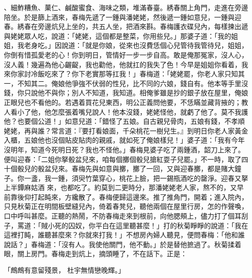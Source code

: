 \begin{showcontents}{}
、細鮓糟魚、菓仁、鹹酸蜜食、海味之類，堆滿春臺。綉春關上角門，走進在旁邊陪坐。於是篩上酒來，春梅先遞了一鍾與潘姥姥，然後遞一鍾如意兒，一鍾與迎春。綉春在旁邊炕兒上坐的，共五人坐，把酒來斟。春梅護衣碟兒內，每樣揀出遞與姥姥眾人吃，說道：「姥姥，這個都是整菜，你用些兒。」那婆子道：「我的姐姐，我老身吃。」因說道：「就是你娘，從來也沒費恁個心兒管待我管待兒，姐姐，你倒有惜孤愛老的心！你到明日，管情好一步一步自高。敢是俺那冤家，沒人心，沒人義！幾遍為他心齷齪，我也勸他，他就扛的我失了色！今早是姐姐你看着，我來你家討冷飯吃來了？你下老實那等扛我！」春梅道：「姥姥罷，你老人家只知其一，不知其二。俺娘他爭強不伏弱的性兒，比不同的六娘，錢自有。他本等手里沒錢，你只說他不與你；別人不知道，我知道。相俺爹雖是抄的銀子放在屋里，俺娘正眼兒也不看他的。若遇着買花兒東西，明公正義問他要，不恁瞞並藏背掖的；教人看小了他，他怎麼張着嘴兒說人！他本沒錢，姥姥怪他，就虧了他了。莫不我護他？也要個公道！」如意兒道：「錯怪了五娘。自古親兒骨肉，五娘有錢，不孝順姥姥，再與誰？常言道：『要打看娘面，千朵桃花一樹兒生。』到明日你老人家黃金入櫃，五娘他也沒個貼皮貼肉的親戚，就如死了俺娘樣兒！」婆子道：「我有今年沒明年，知道今死明日死？我也不怪他。」春梅見婆子吃了兩鍾酒，韶刀上來了。便叫迎春：「二姐你拏骰盆兒來，咱每個擲個骰兒搶紅耍子兒罷。」不一時，取了四十個骰兒的骰盆兒來。春梅先與如意與擲，擲了一回，又與迎春擲，都是賭大鐘子。你一盞，我一鍾，須臾竹葉穿心，桃花上臉，把一錫瓶酒吃的罄淨。迎春又拏上半鐔麻姑酒 來，也都吃了。約莫到二更時分，那潘姥姥老人家，熬不的，又早前靠後仰打起盹來，方纔散了。春梅便歸這邊來。推了推角門，開着；進入院內，只見秋菊正在明間板壁縫兒內，倚着春凳兒，聽他兩個在屋里行房，怎的作聲喚，口中呼叫甚麼。正聽的熱鬧，不防春梅走來到根前，向他腮頰上，儘力打了個耳刮子，罵道：「賊小死的囚奴，你平白在這里聽甚麼！」打的秋菊睜睜的說道：「我在這裡打盹，誰聽甚麼來？你就來打我！」不想房內婦人聽見，便問春梅：「他和誰說話？」春梅道：「沒有人。我使他關門，他不動。」於是替他摭過了。秋菊揉着眼，關上房門。春梅走到炕上，摘頭睡了，不在話下。正是：

「鷓鷓有意留殘景，  杜宇無情戀晚輝。」


\end{showcontents}
